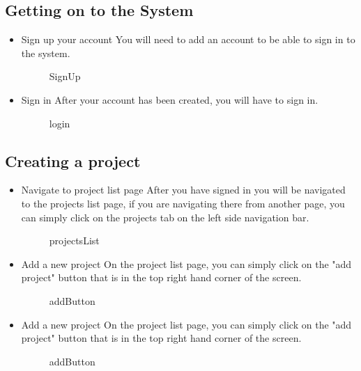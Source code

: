 \subsection{Getting on to the System}
\begin{itemize}
	\item{Sign up your account}
	\newline
	You will need to add an account to be able to sign in to the system.
	\begin{figure}[H]
	    	\centering
	    	\caption{SignUp}
	    	\label{fig:Learning rate 0.1}
   	\end{figure}
	\item{Sign in}
	\newline
	After your account has been created, you will have to sign in.
	\begin{figure}[H]
	    	\centering
	    	\caption{login}
	    	\label{fig:Learning rate 0.1}
   	\end{figure}
\end{itemize}
\subsection{Creating a project}
\begin{itemize}
	\item{Navigate to project list page}
	\newline
	After you have signed in you will be navigated to the projects list page, if you are navigating there from another page, you can simply click on the projects tab on the left side navigation bar.
	\begin{figure}[H]
	    	\centering
	    	\caption{projectsList}
	    	\label{fig:Learning rate 0.1}
   	\end{figure}
	\item{Add a new project}
	\newline
	On the project list page, you can simply click on the "add project" button that is in the top right hand corner of the screen.
	\begin{figure}[H]
	    	\centering
	    	\caption{addButton}
	    	\label{fig:Learning rate 0.1}
   	\end{figure}
	\item{Add a new project}
	\newline
	On the project list page, you can simply click on the "add project" button that is in the top right hand corner of the screen.
	\begin{figure}[H]
	    	\centering
	    	\caption{addButton}
	    	\label{fig:Learning rate 0.1}
   	\end{figure}
\end{itemize}